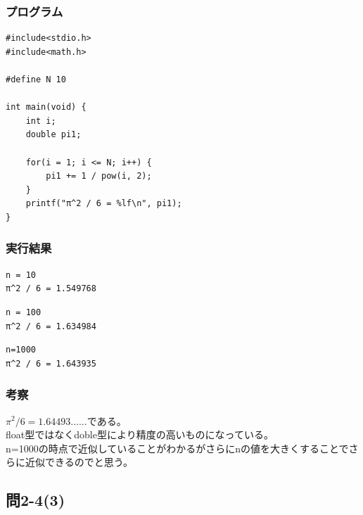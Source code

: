 \documentclass{jarticle}
\begin{document}
\subsubsection{プログラム\\}
\begin{breakbox}
\begin{verbatim}
#include<stdio.h>
#include<math.h>

#define N 10 

int main(void) { 
    int i;
    double pi1;

    for(i = 1; i <= N; i++) {
        pi1 += 1 / pow(i, 2);
    }
    printf("π^2 / 6 = %lf\n", pi1);
}
\end{verbatim}
\end{breakbox}

\subsubsection{実行結果\\}
\begin{breakbox}
\begin{verbatim}
n = 10
π^2 / 6 = 1.549768
\end{verbatim}
\end{breakbox}

\begin{breakbox}
\begin{verbatim}
n = 100
π^2 / 6 = 1.634984
\end{verbatim}
\end{breakbox}

\begin{breakbox}
\begin{verbatim}
n=1000
π^2 / 6 = 1.643935
\end{verbatim}
\end{breakbox}
\subsubsection{考察\\}
$π^2 / 6 = 1.64493......である。$\\
float型ではなくdoble型により精度の高いものになっている。\\
n=1000の時点で近似していることがわかるがさらにnの値を大きくすることでさらに近似できるのでと思う。\\

\subsection{問2-4(3)\\}
\end{document}
